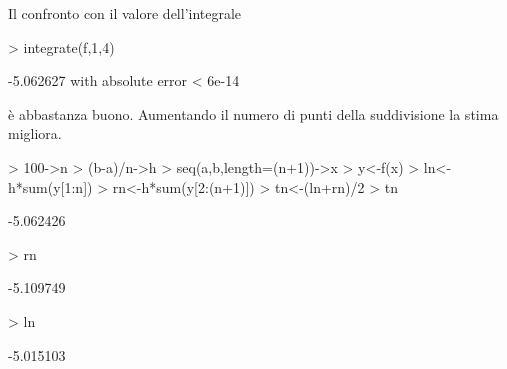 \documentclass[onecolumn,11pt]{book}
\begin{document}
Il confronto con il valore dell'integrale
\begin{Schunk}
\begin{Sinput}
> integrate(f,1,4)
\end{Sinput}
\begin{Soutput}
-5.062627 with absolute error < 6e-14
\end{Soutput}
\end{Schunk}
\`e abbastanza buono. Aumentando il numero di punti della suddivisione la stima migliora.
\begin{Schunk}
\begin{Sinput}
> 100->n
> (b-a)/n->h
> seq(a,b,length=(n+1))->x
> y<-f(x)
> ln<-h*sum(y[1:n])
> rn<-h*sum(y[2:(n+1)])
> tn<-(ln+rn)/2
> tn
\end{Sinput}
\begin{Soutput}
[1] -5.062426
\end{Soutput}
\begin{Sinput}
> rn
\end{Sinput}
\begin{Soutput}
[1] -5.109749
\end{Soutput}
\begin{Sinput}
> ln
\end{Sinput}
\begin{Soutput}
[1] -5.015103
\end{Soutput}
\end{Schunk}
\end{document}
